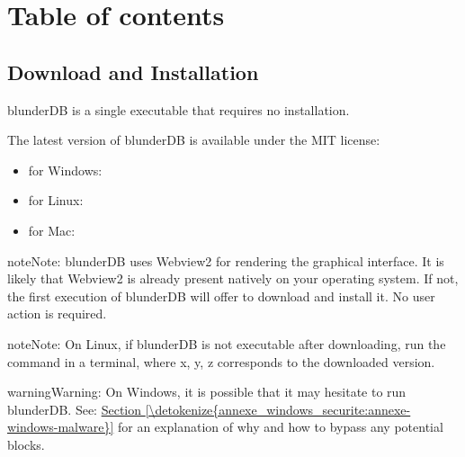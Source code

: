 \documentclass[letterpaper,10pt,english]{sphinxmanual}
\begin{document}
\chapter{Table of contents}
\label{\detokenize{index:sommaire}}
\sphinxstepscope


\section{Download and Installation}
\label{\detokenize{telecharge_install:telechargement-et-installation}}\label{\detokenize{telecharge_install::doc}}
\sphinxAtStartPar
blunderDB is a single executable that requires no installation.

\sphinxAtStartPar
The latest version of blunderDB is available under the MIT license:
\begin{itemize}
\item {} 
\sphinxAtStartPar
for Windows: 

\item {} 
\sphinxAtStartPar
for Linux: 

\item {} 
\sphinxAtStartPar
for Mac: 

\end{itemize}

\begin{sphinxadmonition}{note}{Note:}
\sphinxAtStartPar
blunderDB uses Webview2 for rendering the graphical interface. It is likely that Webview2 is already present natively on your operating system. If not, the first execution of blunderDB will offer to download and install it. No user action is required.
\end{sphinxadmonition}

\begin{sphinxadmonition}{note}{Note:}
\sphinxAtStartPar
On Linux, if blunderDB is not executable after downloading, run the command  in a terminal, where x, y, z corresponds to the downloaded version.
\end{sphinxadmonition}

\begin{sphinxadmonition}{warning}{Warning:}
\sphinxAtStartPar
On Windows, it is possible that it may hesitate to run blunderDB. See: \hyperref[\detokenize{annexe_windows_securite:annexe-windows-malware}]{Section \ref{\detokenize{annexe_windows_securite:annexe-windows-malware}}} for an explanation of why and how to bypass any potential blocks.
\end{sphinxadmonition}
\end{document}

